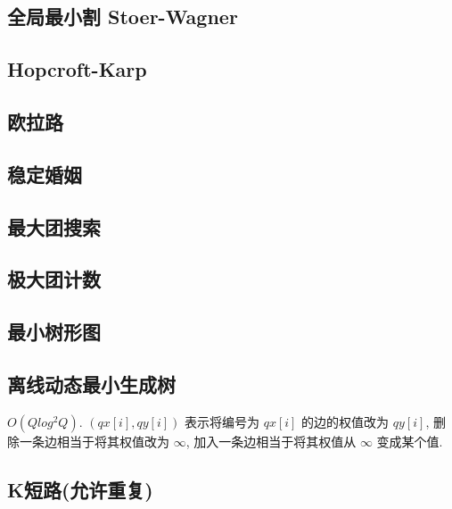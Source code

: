 \documentclass[landscape, twocolumn, 8pt, a4paper, twoside]{extarticle}
\begin{document}
  \subsection{全局最小割 Stoer-Wagner}
    

  \subsection{Hopcroft-Karp}
    

  \subsection{欧拉路}
    

  \subsection{稳定婚姻}
    

  \subsection{最大团搜索}
    
  
  \subsection{极大团计数}
    

  \subsection{最小树形图}
    

  \subsection{离线动态最小生成树}
    $O (Q log^2 Q) $.
    $(qx[i], qy[i])$ 表示将编号为 $qx[i]$ 的边的权值改为 $qy[i]$,
    删除一条边相当于将其权值改为 $\infty$,
    加入一条边相当于将其权值从 $\infty$ 变成某个值.
    

  \subsection{K短路(允许重复)}
    
\end{document}
